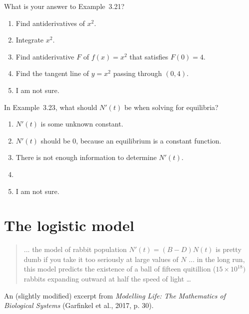 \documentclass[t, 14pt]{beamer}
\begin{document}
\begin{frame}
  What is your answer to Example~3.21?
  \begin{enumerate} 
    \item Find antiderivatives of \(x^{2}\).
    \item Integrate \(x^{2}\).
    \item Find antiderivative \(F\) of \(f(x) = x^{2}\) that satisfies \(F(0) = 4\).
    \item Find the tangent line of \(y = x^{2}\) passing through \((0,4)\).
    \item I am not sure. 
  \end{enumerate}
\end{frame}

\begin{frame}
  In Example~3.23, what should \(N'(t)\) be when solving for equilibria?

  \begin{enumerate} 
    \item \(N'(t)\) is some unknown constant.
    \item \(N'(t)\) should be \(0\), because an equilibrium is a constant function.
    \item There is not enough information to determine \(N'(t)\).
    \item 
    \item I am not sure. 
  \end{enumerate}
\end{frame}

\section{The logistic model}

\begin{frame}
  \small

  \begin{quote}
    ... the model of rabbit population \(N'(t) = (B-D) N(t)\) is pretty dumb if you take it too seriously at large values of \(N\) ... in the long run, this model predicts the existence of a ball of fifteen quitillion (\(15 \times 10^{18})\) rabbits expanding outward at half the speed of light \ldots{}
  \end{quote}

  An (slightly modified) excerpt from \emph{Modelling Life: The Mathematics of Biological Systems} (Garfinkel et al., 2017, p. 30).
\end{frame}
\end{document}
